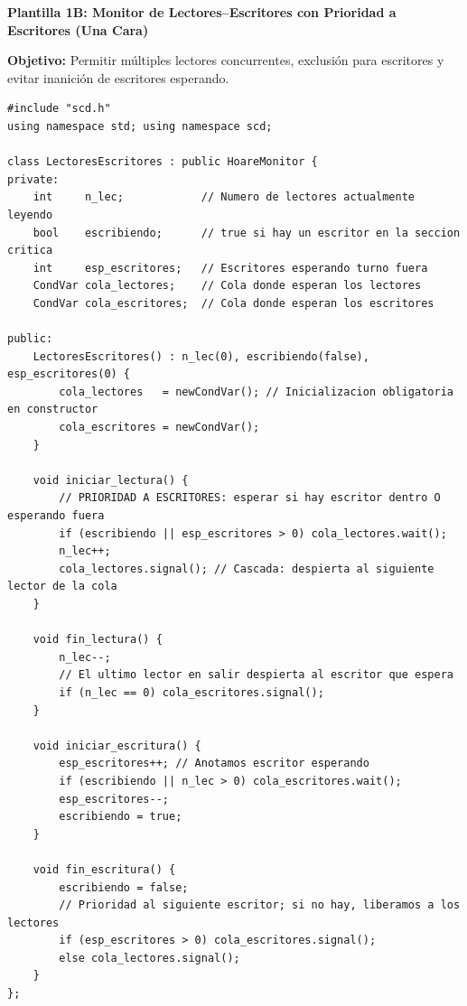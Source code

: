 \documentclass[11pt,a4paper]{article}
\begin{document}
\clearpage

\begin{tcolorbox}[colback=scdPrimary,colframe=scdPrimary,arc=3pt,left=6pt,right=6pt,top=3pt,bottom=3pt]
    \centering\bfseries\color{white}\normalsize Plantilla 1B: Monitor de Lectores--Escritores con Prioridad a Escritores (Una Cara)
\end{tcolorbox}
\vspace{-0.15cm}
{\scriptsize \textbf{Objetivo:} Permitir múltiples lectores concurrentes, exclusión para escritores y evitar inanición de escritores esperando.}

\begin{lstlisting}
#include "scd.h"
using namespace std; using namespace scd;

class LectoresEscritores : public HoareMonitor {
private:
    int     n_lec;            // Numero de lectores actualmente leyendo
    bool    escribiendo;      // true si hay un escritor en la seccion critica
    int     esp_escritores;   // Escritores esperando turno fuera
    CondVar cola_lectores;    // Cola donde esperan los lectores
    CondVar cola_escritores;  // Cola donde esperan los escritores

public:
    LectoresEscritores() : n_lec(0), escribiendo(false), esp_escritores(0) {
        cola_lectores   = newCondVar(); // Inicializacion obligatoria en constructor
        cola_escritores = newCondVar();
    }

    void iniciar_lectura() {
        // PRIORIDAD A ESCRITORES: esperar si hay escritor dentro O esperando fuera
        if (escribiendo || esp_escritores > 0) cola_lectores.wait();
        n_lec++;
        cola_lectores.signal(); // Cascada: despierta al siguiente lector de la cola
    }

    void fin_lectura() {
        n_lec--;
        // El ultimo lector en salir despierta al escritor que espera
        if (n_lec == 0) cola_escritores.signal();
    }

    void iniciar_escritura() {
        esp_escritores++; // Anotamos escritor esperando
        if (escribiendo || n_lec > 0) cola_escritores.wait();
        esp_escritores--;
        escribiendo = true;
    }

    void fin_escritura() {
        escribiendo = false;
        // Prioridad al siguiente escritor; si no hay, liberamos a los lectores
        if (esp_escritores > 0) cola_escritores.signal();
        else cola_lectores.signal();
    }
};
\end{lstlisting}
\end{document}
